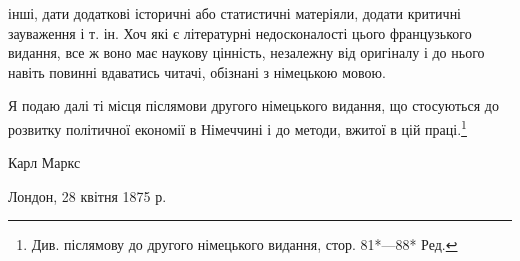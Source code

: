 інші, дати додаткові історичні або статистичні матеріяли, додати
критичні зауваження і т. ін. Хоч які є літературні недосконалості
цього французького видання, все ж воно має наукову цінність,
незалежну від оригіналу і до нього навіть повинні вдаватись
читачі, обізнані з німецькою мовою.

Я подаю далі ті місця післямови другого німецького видання,
що стосуються до розвитку політичної економії в Німеччині і до
методи, вжитої в цій праці.\footnote*{
Див. післямову до другого німецького видання, стор. 81*—88* Ред.
}

Карл Маркс

Лондон, 28 квітня 1875 р.